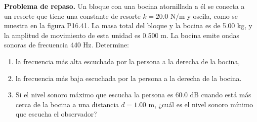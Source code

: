 \item \textbf{Problema de repaso.}
Un bloque con una bocina atornillada a él se conecta a un resorte que tiene una constante de resorte $k = 20.0\text{ N/m}$ y oscila, como se muestra en la figura P16.41. La masa total del bloque y la bocina es de 5.00 kg, y la amplitud de movimiento de esta unidad es 0.500 m. La bocina emite ondas sonoras de frecuencia 440 Hz. Determine:
\begin{enumerate}
    \item la frecuencia más alta escuchada por la persona a la derecha de la bocina,
    \item la frecuencia más baja escuchada por la persona a la derecha de la bocina.
    \item Si el nivel sonoro máximo que escucha la persona es 60.0 dB cuando está más cerca de la bocina a una distancia $d = 1.00\text{ m}$, ¿cuál es el nivel sonoro mínimo que escucha el observador?
\end{enumerate}